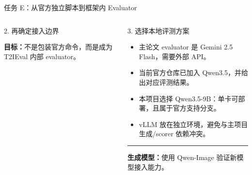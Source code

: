 \documentclass[aspectratio=169,10pt]{beamer}
\begin{document}
\begin{frame}{任务 E：从官方独立脚本到框架内 Evaluator}
\begin{columns}[T,onlytextwidth]
\begin{block}{2. 再确定接入边界}
\begin{minipage}[c][4.95cm][c]{\linewidth}
          \scriptsize\textbf{目标：}不是包装官方命令，而是成为 T2IEval 内部 evaluator。
        \end{minipage}
      \end{block}
      \begin{block}{3. 选择本地评测方案}
        \begin{minipage}[c][4.95cm][c]{\linewidth}
          \begin{itemize}\scriptsize
            \item 主论文 evaluator 是 Gemini 2.5 Flash，需要外部 API。
            \item 当前官方仓库已加入 Qwen3.5，并给出对应评测结果。
            \item 本项目选择 Qwen3.5-9B：单卡可部署，且属于官方支持分支。
            \item vLLM 放在独立环境，避免与主项目生成/scorer 依赖冲突。
          \end{itemize}
          \vspace{0.35em}
          \color{T2IGray}\rule{\linewidth}{0.35pt}\par\vspace{0.25em}
          \scriptsize\textbf{生成模型：}使用 Qwen-Image 验证新模型接入能力。
        \end{minipage}
      \end{block}
  \end{columns}
\end{frame}
\end{document}
